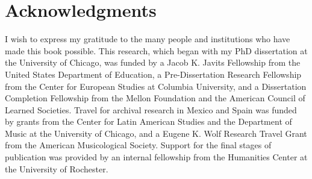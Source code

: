 \chapter{Acknowledgments}
\label{ch:thanks}

I wish to express my gratitude to the many people and institutions who have
made this book possible.
This research, which began with my PhD dissertation at the University of
Chicago, was funded by a Jacob K. Javits Fellowship from the United States
Department of Education, a Pre-Dissertation Research Fellowship from the
Center for European Studies at Columbia University, and a Dissertation
Completion Fellowship from the Mellon Foundation and the American Council of
Learned Societies.
Travel for archival research in Mexico and Spain was funded by grants from the
Center for Latin American Studies and the Department of Music at the
University of Chicago, and a Eugene K. Wolf Research Travel Grant from the
American Musicological Society.
Support for the final stages of publication was provided by an internal
fellowship from the Humanities Center at the University of Rochester.

